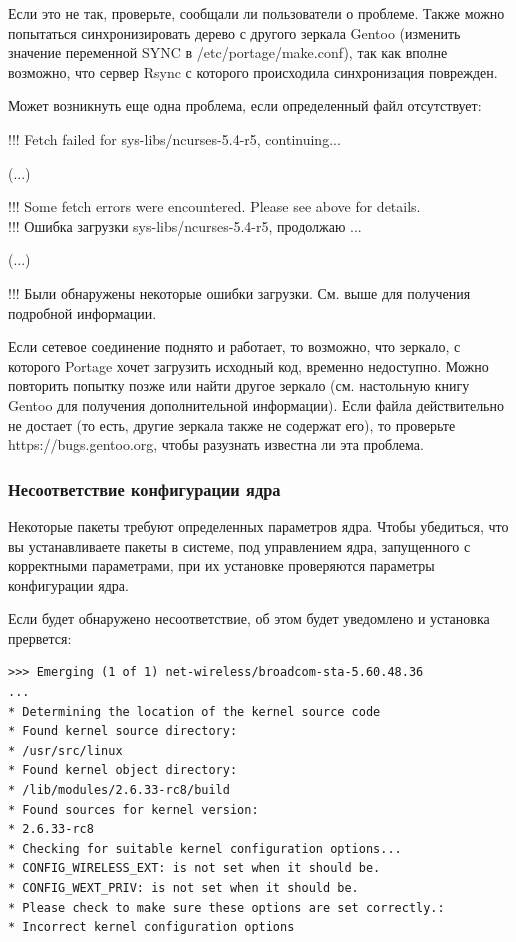 \documentclass[10pt]{book}
\begin{document}
Если это не так, проверьте, сообщали ли пользователи о проблеме. Также можно попытаться синхронизировать дерево с другого зеркала Gentoo (изменить значение переменной SYNC в /etc/portage/make.conf), так как вполне возможно, что сервер Rsync с которого происходила синхронизация поврежден.

Может возникнуть еще одна проблема, если определенный  файл отсутствует:
 \begin{tcolorbox}
!!! Fetch failed for sys-libs/ncurses-5.4-r5, continuing...

(...)

!!! Some fetch errors were encountered. Please see above for details. \\

!!! Ошибка загрузки sys-libs/ncurses-5.4-r5, продолжаю ...

(...)

!!! Были обнаружены некоторые ошибки загрузки. См. выше для получения подробной информации. 
\end{tcolorbox}
Если сетевое соединение поднято и работает, то возможно, что зеркало, с которого Portage хочет загрузить исходный код, временно недоступно. Можно повторить попытку позже или найти другое зеркало (см. настольную книгу Gentoo для получения дополнительной информации). Если файла действительно не достает (то есть, другие зеркала также не содержат его), то проверьте https://bugs.gentoo.org, чтобы разузнать известна ли эта проблема.

\subsubsection{Несоответствие конфигурации ядра}
Некоторые пакеты требуют определенных параметров ядра. Чтобы убедиться, что вы устанавливаете пакеты в системе, под управлением ядра, запущенного с корректными параметрами, при их установке проверяются параметры конфигурации ядра.

Если будет обнаружено несоответствие, об этом будет уведомлено и установка прервется:
 \begin{tcolorbox}
\begin{lstlisting}
>>> Emerging (1 of 1) net-wireless/broadcom-sta-5.60.48.36
...
* Determining the location of the kernel source code
* Found kernel source directory:
* /usr/src/linux
* Found kernel object directory:
* /lib/modules/2.6.33-rc8/build
* Found sources for kernel version:
* 2.6.33-rc8
* Checking for suitable kernel configuration options...
* CONFIG_WIRELESS_EXT: is not set when it should be.
* CONFIG_WEXT_PRIV: is not set when it should be.
* Please check to make sure these options are set correctly.:
* Incorrect kernel configuration options
\end{lstlisting}
\end{tcolorbox}
\end{document}
